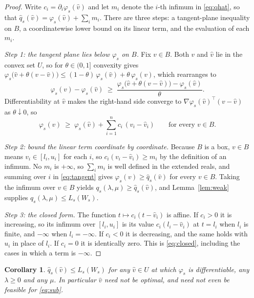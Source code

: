 \documentclass[11pt]{article}
\theoremstyle{plain}
\newtheorem{corollary}[lemma]{Corollary}
\theoremstyle{remark}
\newcommand{\W}{W}
\newcommand{\vhat}{\hat{v}}
\newcommand{\qhat}{\hat{q}}
\begin{document}
\begin{proof}
Write $c_i = \partial_i \varphi_s(\vhat)$ and let $m_i$ denote the $i$-th
infimum in \eqref{eq:qhat}, so that
$\qhat_s(\vhat) = \varphi_s(\vhat) + \sum_i m_i$.  There are three steps: a
tangent-plane inequality on $B$, a coordinatewise lower bound on its linear
term, and the evaluation of each $m_i$.

\emph{Step 1: the tangent plane lies below $\varphi_s$ on $B$.}  Fix
$v \in B$.  Both $v$ and $\vhat$ lie in the convex set $U$, so for
$\theta \in (0,1]$ convexity gives
$\varphi_s\bigl(\vhat + \theta(v - \vhat)\bigr)
  \le (1-\theta)\,\varphi_s(\vhat) + \theta\,\varphi_s(v)$, which rearranges to
\[
  \varphi_s(v) - \varphi_s(\vhat) \;\ge\;
  \frac{\varphi_s\bigl(\vhat + \theta(v - \vhat)\bigr) - \varphi_s(\vhat)}{\theta}.
\]
Differentiability at $\vhat$ makes the right-hand side converge to
$\nabla \varphi_s(\vhat)^{\top}(v - \vhat)$ as $\theta \downarrow 0$, so
\begin{equation}\label{eq:tangent}
  \varphi_s(v) \;\ge\; \varphi_s(\vhat) + \sum_{i=1}^{n} c_i\,(v_i - \vhat_i)
  \qquad \text{for every } v \in B .
\end{equation}

\emph{Step 2: bound the linear term coordinate by coordinate.}  Because $B$ is a
box, $v \in B$ means $v_i \in [l_i, u_i]$ for each $i$, so
$c_i (v_i - \vhat_i) \ge m_i$ by the definition of an infimum.  No $m_i$ is
$+\infty$, so $\sum_i m_i$ is well defined in the extended reals, and summing
over $i$ in \eqref{eq:tangent} gives $\varphi_s(v) \ge \qhat_s(\vhat)$ for
every $v \in B$.  Taking the infimum over $v \in B$ yields
$q_s(\lambda,\mu) \ge \qhat_s(\vhat)$, and Lemma~\ref{lem:weak} supplies
$q_s(\lambda,\mu) \le L_s(\W_s)$.

\emph{Step 3: the closed form.}  The function $t \mapsto c_i (t - \vhat_i)$ is
affine.  If $c_i > 0$ it is increasing, so its infimum over $[l_i, u_i]$ is its
value $c_i(l_i - \vhat_i)$ at $t = l_i$ when $l_i$ is finite, and $-\infty$ when
$l_i = -\infty$.  If $c_i < 0$ it is decreasing, and the same holds with $u_i$
in place of $l_i$.  If $c_i = 0$ it is identically zero.  This is
\eqref{eq:closed}, including the cases in which a term is $-\infty$.
\end{proof}

\begin{corollary}\label{cor:anypoint}
$\qhat_s(\vhat) \le L_s(\W_s)$ for \emph{any} $\vhat \in U$ at which
$\varphi_s$ is differentiable, \emph{any} $\lambda \ge 0$ and \emph{any} $\mu$.  In particular
$\vhat$ need not be optimal, and need not even be feasible for \eqref{eq:sub}.
\end{corollary}
\end{document}
